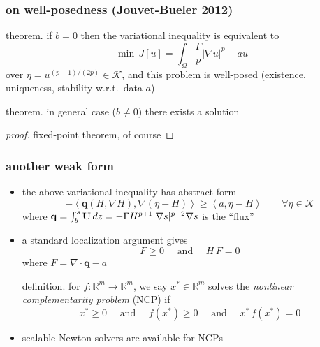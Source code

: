 \documentclass[hide notes,intlimits]{beamer}
\newcommand{\RR}{\mathbb{R}}
\newcommand{\Kcal}{\mathcal{K}}
\newcommand{\bq}{\mathbf{q}}
\newcommand{\Div}{\nabla\cdot}
\newcommand{\grad}{\nabla}
\newcommand{\ip}[2]{\ensuremath{\left<#1,#2\right>}}
\begin{document}
\begin{frame}
  \frametitle{on well-posedness (Jouvet-Bueler 2012)} 
\begin{block}{theorem.}
if $b=0$ then the variational inequality is equivalent to
  $$\min \, J[u] = \int_{\Omega} \frac{\Gamma}{p} |\grad u|^p - a u$$
over $\eta = u^{(p-1)/(2p)} \in \Kcal$, and this problem is well-posed (existence, uniqueness, stability w.r.t.~data $a$)
\end{block}
\begin{block}{theorem.}
in general case ($b\ne 0$) there exists a solution
\end{block}
\begin{proof}[proof]
fixed-point theorem, of course
\end{proof}
\end{frame}


\begin{frame}
  \frametitle{another weak form} 
\begin{itemize}
\item the above variational inequality has abstract form
  $$- \ip{\bq(H,\grad H)}{\grad(\eta - H)} \ge \ip{a}{\eta-H} \qquad \forall \eta \in \Kcal$$
where $\bq=\int_b^s {\bf U}\, dz=-\Gamma H^{p+1} |\grad s|^{p-2} \grad s$ is the ``flux''
\item a standard localization argument gives
  $$F \ge 0 \quad \text{ and } \quad H\,F = 0$$
where $F = \Div \bq - a$
\begin{block}{definition.}
for $f:\RR^m \to \RR^m$, we say $x^* \in \RR^m$ solves the \emph{nonlinear complementarity problem} (NCP) if
  $$x^* \ge 0  \quad \text{ and } \quad f(x^*)\ge 0 \quad \text{ and } \quad x^*\,f(x^*)=0$$
\end{block}
\item scalable Newton solvers are available for NCPs
\end{itemize}
\end{frame}
\end{document}

